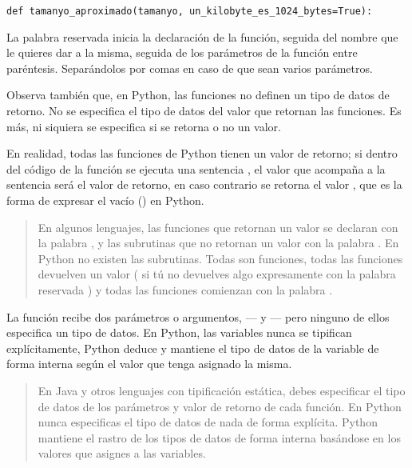 \begin{lstlisting}
def tamanyo_aproximado(tamanyo, un_kilobyte_es_1024_bytes=True):
\end{lstlisting}

La palabra reservada  inicia la declaración de la función, seguida del nombre que le quieres dar a la misma, seguida de los parámetros de la función entre paréntesis. Separándolos por comas en caso de que sean varios parámetros.


Observa también que, en Python, las funciones no definen un tipo de datos de retorno. No se especifica el tipo de datos del valor que retornan las funciones. Es más, ni siquiera se especifica si se retorna o no un valor. 

En realidad, todas las funciones de Python tienen un valor de retorno; si dentro del código de la función se ejecuta una sentencia , el valor que acompaña a la sentencia será el valor de retorno, en caso contrario se retorna el valor , que es la forma de expresar el vacío () en Python.

\begin{quote}
En algunos lenguajes, las funciones que retornan un valor se declaran con la palabra , y las subrutinas que no retornan un valor con la palabra . En Python no existen las subrutinas. Todas son funciones, todas las funciones devuelven un valor ( si tú no devuelves algo expresamente con la palabra reservada ) y todas las funciones comienzan con la palabra .
\end{quote}

La función  recibe dos parámetros o argumentos, --- y --- pero ninguno de ellos especifica un tipo de datos. En Python, las variables nunca se tipifican explícitamente, Python deduce y  mantiene el tipo de datos de la variable de forma interna según el valor que tenga asignado la misma.

\begin{quote}
En Java y otros lenguajes con tipificación estática, debes especificar el tipo de datos de los parámetros y valor de retorno de cada función. En Python nunca especificas el tipo de datos de nada de forma explícita. Python mantiene el rastro de los tipos de datos de forma interna basándose en los valores que asignes a las variables.
\end{quote}

